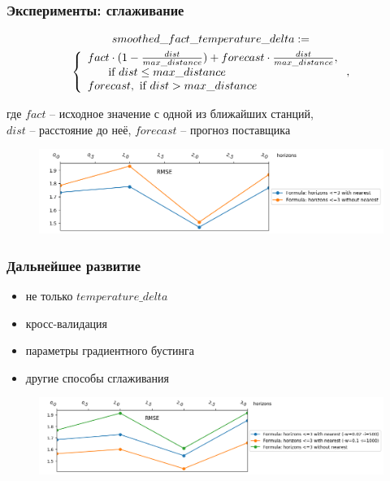 \documentclass{beamer}
\begin{document}
\begin{frame}\frametitle{Эксперименты: сглаживание}
\setlength\parindent{24pt}

\begingroup
\setlength\abovedisplayskip{0pt}

\begin{multline*}
smoothed\_fact\_temperature\_delta := \\\left\{
    \begin{array}{ll}
      fact \cdot (1 - \frac{dist}{max\_distance}) + forecast \cdot \frac{dist}{max\_distance},
      \\\indent \text{     if }dist \le max\_distance  \\
      forecast, \text{ if } dist > max\_distance
    \end{array}
  \right.,
\end{multline*}
\endgroup

{\scriptsize 
    \indent где $fact$ -- исходное значение с одной из ближайших станций, \\
    \indent $dist$ -- расстояние до неё, $forecast$ -- прогноз поставщика
}

\begin{figure}
\centering
\includegraphics[width=\linewidth]{images/pic3_metrics_final.png}
\end{figure}

\end{frame}


\begin{frame}\frametitle{Дальнейшее развитие}

\begin{itemize}
    \item не только $temperature\_delta$
    \item кросс-валидация
    \item параметры градиентного бустинга
    \item другие способы сглаживания
\end{itemize}

\begin{figure}
\centering
\includegraphics[width=\linewidth]{images/pic4_params.png}
\end{figure}

\end{frame}
\end{document}
